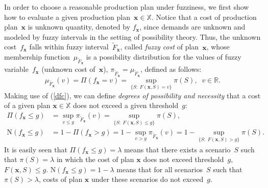 \documentclass[11pt]{article}
\newcommand{\Rset}{\mathbb{R}}
\newcommand{\Xset}{\mathbb{X}}
\begin{document}
In order to  choose a reasonable production plan under fuzziness, we 
first show how to evaluate a given production plan~$\pmb{x}\in \Xset$.
Notice that a cost of  production plan~$\pmb{x}$ is unknown quantity, denoted by $f_{\pmb{x}}$, since demands are unknown and
modeled by fuzzy intervals in the setting of possibility theory.
Thus, the unknown cost~$f_{\pmb{x}}$ falls within fuzzy interval~$\widetilde{F}_{\pmb{x}}$, called
\emph{fuzzy cost} of plan~$\pmb{x}$, whose 
 membership function~$\mu_{\widetilde{F}_{\pmb{x}}}$
is a  possibility distribution for the 
  values of  fuzzy variable~$f_{\pmb{x}}$
  (unknown cost of~$\pmb{x}$), $\pi_{\widetilde{F}_{\pmb{x}}}=\mu_{\widetilde{F}_{\pmb{x}}}$,
defined as follows:
\begin{equation}
\mu_{\widetilde{F}_{\pmb{x}}}(v)=\Pi(f_{\pmb{x}}=v)=
\sup_{\{S: \;F(\pmb{x},S)=v\}}\pi(S), \;\;v\in\Rset. \label{dfc}
\end{equation}
Making use of (\ref{dfc}), we can define \emph{degrees of possibility and
necessity} that a cost of 
a given plan  $\pmb{x}\in \Xset$  does not exceed a given threshold~$g$:
\begin{align}
\Pi(f_{\pmb{x}}\leq g)&=\sup_{v\leq g}\pi_{\widetilde{F}_{\pmb{x}}}(v)=
\sup_{\{S: \;F(\pmb{x},S)\leq g\}}\pi(S),\label{pdx}\\
\mathrm{N}(f_{\pmb{x}}\leq g)&= 1-\Pi(f_{\pmb{x}}> g)=
1-\sup_{v>g}\pi_{\widetilde{F}_{\pmb{x}}}(v)
=1-\sup_{\{S: \;F(\pmb{x},S)> g\}}\pi(S).\label{ndx}
\end{align}
It is easily seen that $\Pi(f_{\pmb{x}}\leq g)=\lambda$ means that there exists a scenario~$S$
such that $\pi(S)=\lambda$ in which the cost of plan $\pmb{x}$ 
does not exceed threshold~$g$, $F(\pmb{x},S)\leq g$.
$\mathrm{N}(f_{\pmb{x}}\leq g)=1-\lambda$
means that for all scenarios~$S$
such that $\pi(S)>\lambda$, costs of plan $\pmb{x}$ under these scenarios 
do not exceed~$g$.
\end{document}
